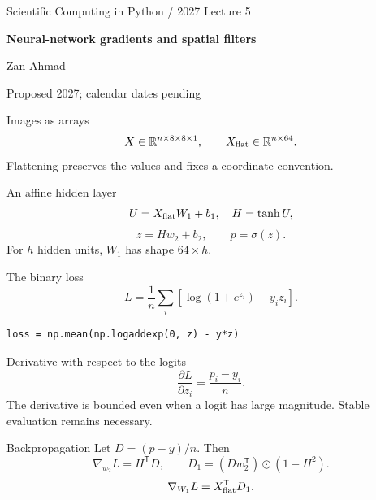 \documentclass[aspectratio=169,11pt]{beamer}
\newcommand{\notestarget}{notes.pdf}\newcommand{\noteslabel}{Notes}
\begin{document}
\begin{frame}[plain]\vfill
{\small\color{accent} Scientific Computing in Python / 2027 \quad Lecture 5}\par\medskip
{\raggedright{}\LARGE\bfseries\color{ink} Neural-network gradients and spatial filters}\par\bigskip
Zan Ahmad\par\smallskip
{\small Proposed 2027; calendar dates pending}\par\vfill\end{frame}
\renewcommand{\notestarget}{notes.pdf\#note-images-as-arrays}
\begin{frame}[t,fragile,label=slide-images-as-arrays]{Images as arrays}
\[
X\in\mathbb{R}^{n\times8\times8\times1},\qquad
X_{\rm flat}\in\mathbb{R}^{n\times64}.
\]
\pause{}
Flattening preserves the values and fixes a coordinate convention.
\end{frame}
\renewcommand{\notestarget}{notes.pdf\#note-images-as-arrays}
\begin{frame}[t,fragile,label=slide-an-affine-hidden-layer]{An affine hidden layer}
\[
U=X_{\rm flat}W_1+b_1,\quad H=\tanh U,
\]
\pause{}
\[
z=Hw_2+b_2,\qquad p=\sigma(z).
\]
For $h$ hidden units, $W_1$ has shape $64\times h$.
\end{frame}
\renewcommand{\notestarget}{notes.pdf\#note-the-binary-loss}
\begin{frame}[t,fragile,label=slide-the-binary-loss]{The binary loss}
\[
L=\frac1n\sum_i[\log(1+e^{z_i})-y_iz_i].
\]
\pause{}
\begin{verbatim}
loss = np.mean(np.logaddexp(0, z) - y*z)
\end{verbatim}
\end{frame}
\renewcommand{\notestarget}{notes.pdf\#note-the-binary-loss}
\begin{frame}[t,fragile,label=slide-derivative-with-respect-to-the-logits]{Derivative with respect to the logits}
\[
\frac{\partial L}{\partial z_i}=\frac{p_i-y_i}{n}.
\]
\pause{}
The derivative is bounded even when a logit has large magnitude. Stable evaluation remains necessary.
\end{frame}
\renewcommand{\notestarget}{notes.pdf\#note-backpropagation}
\begin{frame}[t,fragile,label=slide-backpropagation]{Backpropagation}
Let $D=(p-y)/n$. Then
\[
\nabla_{w_2}L=H^{\mathsf T}D,\qquad D_1=(Dw_2^{\mathsf T})\odot(1-H^2).
\]
\pause{}
\[
\nabla_{W_1}L=X_{\rm flat}^{\mathsf T}D_1.
\]
\end{frame}
\renewcommand{\notestarget}{notes.pdf\#note-local-cross-correlation}
\end{document}
